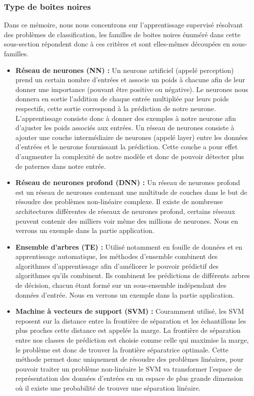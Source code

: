 \subsubsection{Type de boites noires}
Dans ce mémoire, nous nous concentrons sur l'apprentissage supervisé résolvant des problèmes de classification, les familles de boites noires énuméré dans cette sous-section répondent donc à ces critères et sont elles-mêmes découpées en sous-familles.
\begin{itemize}
    \item \textbf{Réseau de neurones (NN) :} Un neurone artificiel (appelé perception) prend un certain nombre d'entrées et associe un poids à chacune afin de leur donner une importance (pouvant être positive ou négative). Le neurones nous donnera en sortie l'addition de chaque entrée multipliée par leurs poids respectifs, cette sortie correspond à la prédiction de notre neurone. L'apprentissage consiste donc à donner des exemples à notre neurone afin d'ajuster les poids associés aux entrées. Un réseau de neurones consiste à ajouter une couche intermédiaire de neurones (appelé layer) entre les données d'entrées et le neurone fournissant la prédiction. Cette couche a pour effet d'augmenter la complexité de notre modèle et donc de pouvoir détecter plus de paternes dans notre entrée.
    
    \item \textbf{Réseau de neurones profond (DNN) :} Un réseau de neurones profond est un réseau de neurones contenant une multitude de couches dans le but de résoudre des problèmes non-linéaire complexe. Il existe de nombreuse architectures différentes de réseaux de neurones profond, certains réseaux peuvent contenir des milliers voir même des millions de neurones. Nous en verrons un exemple dans la partie application.
    
    \item \textbf{Ensemble d'arbres (TE) :} Utilisé notamment en fouille de données et en apprentissage automatique, les méthodes d'ensemble combinent des algorithmes d'apprentissage afin d'améliorer le pouvoir prédictif des algorithmes qu'ils combinent. Ils combinent les prédictions de différents arbres de décision, chacun étant formé sur un sous-ensemble indépendant des données d'entrée. Nous en verrons un exemple dans la partie application.
    
    \item \textbf{Machine à vecteurs de support (SVM) :} Couramment utilisé, les SVM reposent sur la distance entre la frontière de séparation et les échantillons les plus proches cette distance est appelée la marge. La frontière de séparation entre nos classes de prédiction est choisie comme celle qui maximise la marge, le problème est donc de trouver la frontière séparatrice optimale. Cette méthode permet donc uniquement de résoudre des problèmes linéaires, pour pouvoir traiter un problème non-linéaire le SVM va transformer l'espace de représentation des données d'entrées en un espace de plus grande dimension où il existe une probabilité de trouver une séparation linéaire.
\end{itemize}

